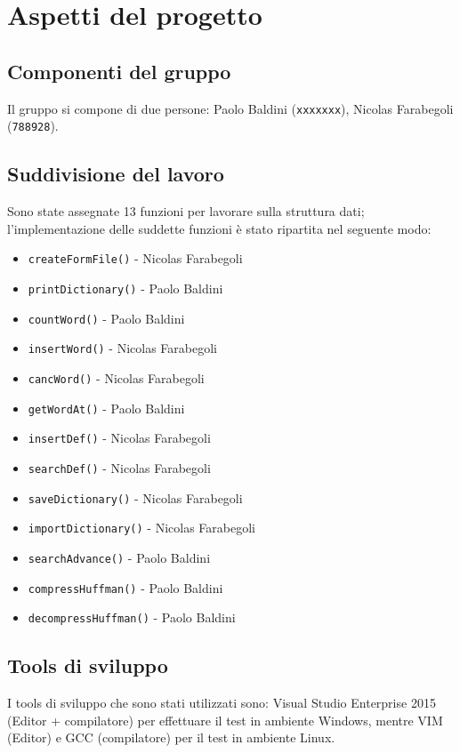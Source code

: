 \documentclass[paper=a4, fontsize=11pt,twoside]{scrartcl}   %
\begin{document}
		\section{Aspetti del progetto}
			\subsection{Componenti del gruppo}
				Il gruppo si compone di due persone: Paolo Baldini (\texttt{xxxxxxx}), Nicolas Farabegoli (\texttt{788928}).
			\subsection{Suddivisione del lavoro}
				Sono state assegnate 13 funzioni per lavorare sulla struttura dati; l'implementazione delle suddette funzioni è stato ripartita nel seguente modo:
				\begin{itemize}
					\item \texttt{createFormFile()} - Nicolas Farabegoli
					\item \texttt{printDictionary()} - Paolo Baldini
					\item \texttt{countWord()} - Paolo Baldini
					\item \texttt{insertWord()} - Nicolas Farabegoli
					\item \texttt{cancWord()} - Nicolas Farabegoli
					\item \texttt{getWordAt()} - Paolo Baldini
					\item \texttt{insertDef()} - Nicolas Farabegoli
					\item \texttt{searchDef()} - Nicolas Farabegoli
					\item \texttt{saveDictionary()} - Nicolas Farabegoli
					\item \texttt{importDictionary()} - Nicolas Farabegoli
					\item \texttt{searchAdvance()} - Paolo Baldini
					\item \texttt{compressHuffman()} - Paolo Baldini
					\item \texttt{decompressHuffman()} - Paolo Baldini			
				\end{itemize}
			 
			 \subsection{Tools di sviluppo}
			 	I tools di sviluppo che sono stati utilizzati sono: Visual Studio Enterprise 2015 (Editor + compilatore) per effettuare il test in ambiente Windows, mentre VIM (Editor) e GCC (compilatore) per il test in ambiente Linux.
			 	
\end{document}

